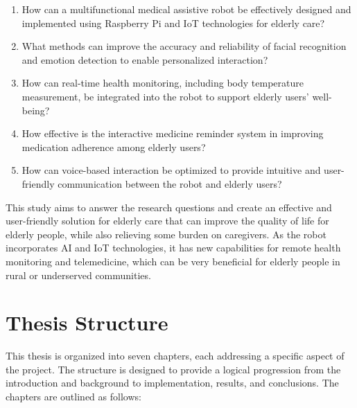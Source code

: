 \begin{enumerate}
    \item How can a multifunctional medical assistive robot be effectively designed and implemented using Raspberry Pi and IoT technologies for elderly care?
    
    \item What methods can improve the accuracy and reliability of facial recognition and emotion detection to enable personalized interaction?
    
    \item How can real-time health monitoring, including body temperature measurement, be integrated into the robot to support elderly users’ well-being?
    
    \item How effective is the interactive medicine reminder system in improving medication adherence among elderly users?
    
    \item How can voice-based interaction be optimized to provide intuitive and user-friendly communication between the robot and elderly users?
\end{enumerate}

This study aims to answer the research questions and create an effective and user-friendly solution for elderly care that can improve the quality of life for elderly people, while also relieving some burden on caregivers. As the robot incorporates AI and IoT technologies, it has new capabilities for remote health monitoring and telemedicine, which can be very beneficial for elderly people in rural or underserved communities.






\section{Thesis Structure}

This thesis is organized into seven chapters, each addressing a specific aspect of the project. The structure is designed to provide a logical progression from the introduction and background to implementation, results, and conclusions. The chapters are outlined as follows:

